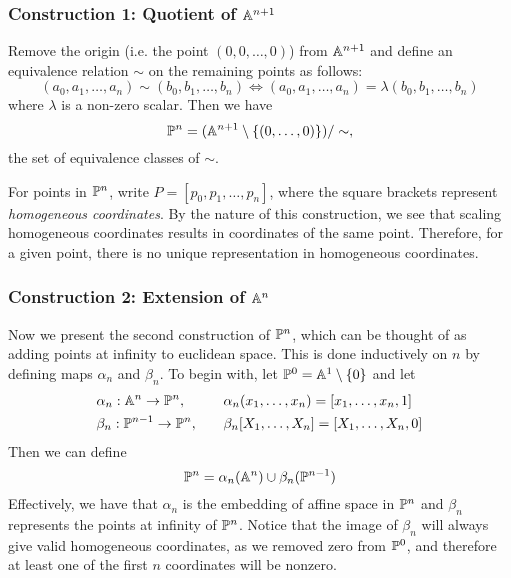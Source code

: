 \subsubsection{Construction 1: Quotient of $\an[n+1]$}
Remove the origin (i.e. the point $(0,0,\ldots,0)$) from $\an[n+1]$ and define an equivalence relation $\sim$ on the remaining points as follows:
$$(a_0,a_1,\ldots,a_n) \sim (b_0,b_1,\ldots,b_n) \iff (a_0,a_1,\ldots,a_n) = \lambda(b_0,b_1,\ldots,b_n)$$
where $\lambda$ is a non-zero scalar. Then we have 
$$\pn = (\an[n+1]\setminus\{(0,\ldots,0)\})/\sim,$$
the set of equivalence classes of $\sim$.

For points in $\pn$, write $P = [p_0,p_1,\ldots,p_n]$, where the square brackets represent \emph{homogeneous coordinates}.
By the nature of this construction, we see that scaling homogeneous coordinates results in coordinates of the same point.
Therefore, for a given point, there is no unique representation in homogeneous coordinates.

\subsubsection{Construction 2: Extension of $\an[n]$}
Now we present the second construction of $\pn$, which can be thought of as adding points at infinity to euclidean space.
This is done inductively on $n$ by defining maps $\alpha_n$ and $\beta_n$.
To begin with, let $\pn[0] = \an[1] \setminus \{0\}$ and let
\begin{alignat*}{2}
&\alpha_n : \an \rightarrow \pn,\quad &&\alpha_n(x_1,\ldots,x_n) = [x_1,\ldots,x_n,1]\\
 &\beta_n : \pn[n-1] \rightarrow \pn,\quad &&\beta_n[X_1,\ldots,X_n] = [X_1,\ldots,X_n,0]
\end{alignat*}
Then we can define
$$\pn = \alpha_n(\an) \cup \beta_n(\pn[n-1])$$
Effectively, we have that $\alpha_n$ is the embedding of affine space in $\pn$ and $\beta_n$ represents the points at infinity of $\pn$.
Notice that the image of $\beta_n$ will always give valid homogeneous coordinates, as we removed zero from $\pn[0]$, and therefore at least one of the first $n$ coordinates will be nonzero.
